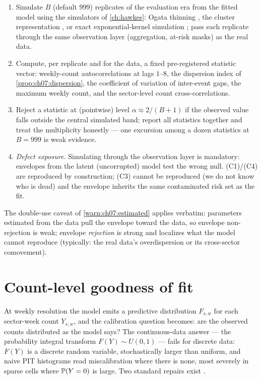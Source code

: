 \begin{protocol}\label{prot:ch07:envelope}
\leavevmode
\begin{enumerate}[label=(\alph*)]
\item Simulate $B$ (default $999$) replicates of the evaluation era from
the fitted model using the simulators of \cref{ch:hawkes}: Ogata thinning
\citep{ogata1981}, the cluster representation \citep{hawkesoakes1974}, or
exact exponential-kernel simulation \citep{dassioszhao2013}; pass each
replicate through the same observation layer (aggregation, at-risk masks)
as the real data.
\item Compute, per replicate and for the data, a fixed pre-registered
statistic vector: weekly-count autocorrelations at lags $1$--$8$, the
dispersion index of \cref{prop:ch07:dispersion}, the coefficient of
variation of inter-event gaps, the maximum weekly count, and the
sector-level count cross-correlations.
\item Reject a statistic at (pointwise) level $\alpha \approx 2/(B+1)$ if
the observed value falls outside the central simulated band; report all
statistics together and treat the multiplicity honestly --- one excursion
among a dozen statistics at $B=999$ is weak evidence.
\item \emph{Defect exposure.} Simulating through the observation layer is
mandatory: envelopes from the latent (uncorrupted) model test the wrong
null. (C1)/(C4) are reproduced by construction; (C3) cannot be reproduced
(we do not know who is dead) and the envelope inherits the same
contaminated risk set as the fit.
\end{enumerate}
\end{protocol}

The double-use caveat of \cref{warn:ch07:estimated} applies verbatim:
parameters estimated from the data pull the envelope toward the data, so
envelope non-rejection is weak; envelope \emph{rejection} is strong and
localizes what the model cannot reproduce (typically: the real data's
overdispersion or its cross-sector comovement).

\section{Count-level goodness of fit}\label{ch07:sec:counts}

At weekly resolution the model emits a predictive distribution
$F_{s,w}$ for each sector-week count $Y_{s,w}$, and the calibration
question becomes: are the observed counts distributed as the model says?
The continuous-data answer --- the probability integral transform
$F(Y)\sim U(0,1)$ --- fails for discrete data: $F(Y)$ is a discrete random
variable, stochastically larger than uniform, and naive PIT histograms
read miscalibration where there is none, most severely in sparse cells
where $\mathbb{P}(Y=0)$ is large. Two standard repairs exist
\citep{smith1985,brockwell2007,czado2009}.

